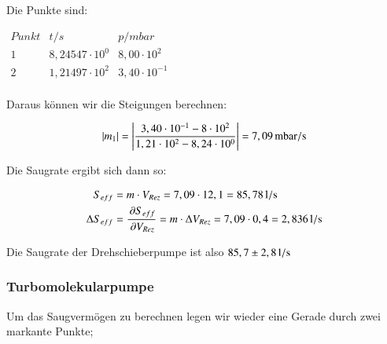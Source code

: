 Die Punkte sind:

\begin{center}
	$
	\begin{matrix}
	Punkt	& t/s & p/mbar \\ 
	1	& 8,24547 \cdot 10^{0} & 8,00 \cdot 10^{2} \\ 
	2	& 1,21497 \cdot 10^{2} & 3,40 \cdot 10^{-1} \\ 

	\end{matrix} 
	$	
\end{center}


Daraus können wir die Steigungen berechnen:

\begin{align*}
|m_1| &= \left| \frac{3,40 \cdot 10^{-1} - 8 \cdot 10^{2}}{1,21 \cdot 10^{2} - 8,24 \cdot 10^{0}} \right| = \unit[7,09]{mbar/s} \\
\end{align*}

Die Saugrate ergibt sich dann so:

\begin{align*}
S_{eff} &= m \cdot V_{Rez} = 7,09 \cdot 12,1 = \unit[85,78]{l/s} \\
\Delta S_{eff} &= \frac{\p S_{eff}}{\p V_{Rez}} = m \cdot \Delta V_{Rez} = 7,09 \cdot 0,4 = \unit[2,836]{l/s}
\end{align*}


Die Saugrate der Drehschieberpumpe ist also $\unit[85,7 \pm 2,8]{l/s}$


\subsubsection*{Turbomolekularpumpe}

Um das Saugvermögen zu berechnen legen wir wieder eine Gerade durch zwei markante Punkte;

\begin{figure}[h]
\end{figure}

